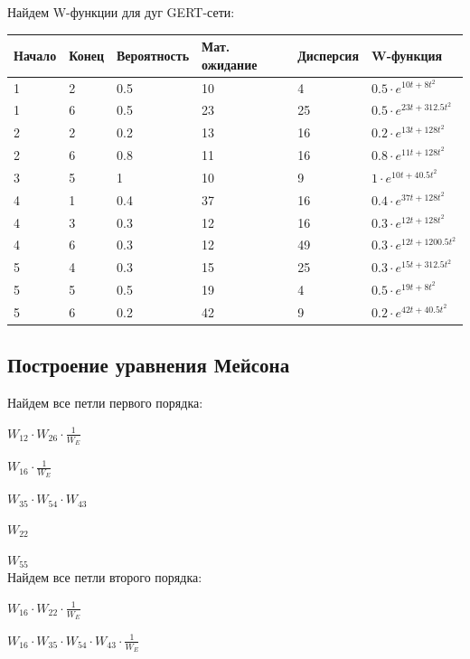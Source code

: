 \documentclass[14pt,a4paper,report]{report}
\begin{document}
Найдем W-функции для дуг GERT-сети:

\begin{table}[h!]
	\centering
	\bgroup
	\def\arraystretch{1}
	\begin{tabular}{ | m{1.4cm} | m{1.4cm} | m{1.9cm} | m{2.4cm} | m{2.0cm} | m{2.4cm} | }
		\hline
		Начало & Конец & Вероятность & Мат. ожидание & Дисперсия & W-функция \\ \hline
		1 & 2 & 0.5 & 10 & 4 & $0.5\cdot e^{10t+8t^2}$ \\ \hline
		1 & 6 & 0.5 & 23 & 25 & $0.5\cdot e^{23t+312.5t^2}$ \\ \hline
		2 & 2 & 0.2 & 13 & 16 & $0.2\cdot e^{13t+128t^2}$ \\ \hline
		2 & 6 & 0.8 & 11 & 16 & $0.8\cdot e^{11t+128t^2}$ \\ \hline
		3 & 5 & 1 & 10 & 9 & $1\cdot e^{10t+40.5t^2}$ \\ \hline
		4 & 1 & 0.4 & 37 & 16 & $0.4\cdot e^{37t+128t^2}$ \\ \hline
		4 & 3 & 0.3 & 12 & 16 & $0.3\cdot e^{12t+128t^2}$ \\ \hline
		4 & 6 & 0.3 & 12 & 49 & $0.3\cdot e^{12t+1200.5t^2}$ \\ \hline
		5 & 4 & 0.3 & 15 & 25 & $0.3\cdot e^{15t+312.5t^2}$ \\ \hline
		5 & 5 & 0.5 & 19 & 4 & $0.5\cdot e^{19t+8t^2}$ \\ \hline
		5 & 6 & 0.2 & 42 & 9 & $0.2\cdot e^{42t+40.5t^2}$ \\
		\hline
	\end{tabular}
	\egroup
\end{table}

\subsection{Построение уравнения Мейсона}

Найдем все петли первого порядка:

$W_{12}\cdot W_{26}\cdot \frac{1}{W_E}$

$W_{16}\cdot \frac{1}{W_E}$

$W_{35}\cdot W_{54}\cdot W_{43}$

$W_{22}$

$W_{55}$\\

Найдем все петли второго порядка:

$W_{16}\cdot W_{22}\cdot \frac{1}{W_E}$

$W_{16}\cdot W_{35}\cdot W_{54}\cdot W_{43}\cdot \frac{1}{W_E}$
\end{document}

